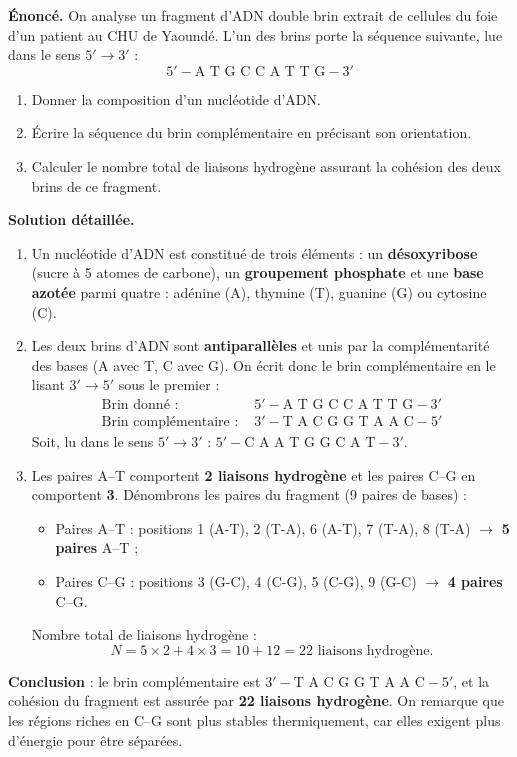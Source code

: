\documentclass[11pt]{article}
\begin{document}
\begin{exoresolu}
\textbf{Énoncé.} On analyse un fragment d'ADN double brin extrait de cellules du foie d'un patient au CHU de Yaoundé. L'un des brins porte la séquence suivante, lue dans le sens $5' \rightarrow 3'$ :
\[ 5'-\text{A T G C C A T T G}-3' \]
\begin{enumerate}
\item Donner la composition d'un nucléotide d'ADN.
\item Écrire la séquence du brin complémentaire en précisant son orientation.
\item Calculer le nombre total de liaisons hydrogène assurant la cohésion des deux brins de ce fragment.
\end{enumerate}
\tcblower
\textbf{Solution détaillée.}
\begin{enumerate}
\item Un nucléotide d'ADN est constitué de trois éléments : un \textbf{désoxyribose} (sucre à 5 atomes de carbone), un \textbf{groupement phosphate} et une \textbf{base azotée} parmi quatre : adénine (A), thymine (T), guanine (G) ou cytosine (C).
\item Les deux brins d'ADN sont \textbf{antiparallèles} et unis par la complémentarité des bases (A avec T, C avec G). On écrit donc le brin complémentaire en le lisant $3' \rightarrow 5'$ sous le premier :
\begin{align*}
\text{Brin donné : } & 5'-\text{A T G C C A T T G}-3'\\
\text{Brin complémentaire : } & 3'-\text{T A C G G T A A C}-5'
\end{align*}
Soit, lu dans le sens $5' \rightarrow 3'$ : $5'-\text{C A A T G G C A T}-3'$.
\item Les paires A--T comportent \textbf{2 liaisons hydrogène} et les paires C--G en comportent \textbf{3}. Dénombrons les paires du fragment (9 paires de bases) :
\begin{itemize}
\item Paires A--T : positions 1 (A-T), 2 (T-A), 6 (A-T), 7 (T-A), 8 (T-A) $\rightarrow$ \textbf{5 paires} A--T ;
\item Paires C--G : positions 3 (G-C), 4 (C-G), 5 (C-G), 9 (G-C) $\rightarrow$ \textbf{4 paires} C--G.
\end{itemize}
Nombre total de liaisons hydrogène :
\[ N = 5 \times 2 + 4 \times 3 = 10 + 12 = 22 \text{ liaisons hydrogène.} \]
\end{enumerate}
\textbf{Conclusion} : le brin complémentaire est $3'-\text{T A C G G T A A C}-5'$, et la cohésion du fragment est assurée par \textbf{22 liaisons hydrogène}. On remarque que les régions riches en C--G sont plus stables thermiquement, car elles exigent plus d'énergie pour être séparées.
\end{exoresolu}
\end{document}
